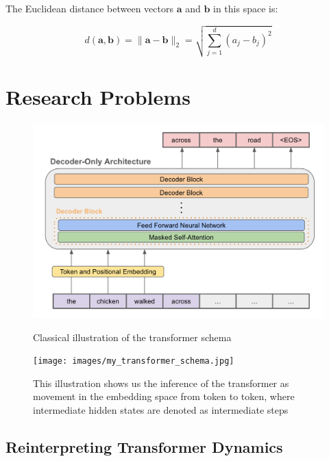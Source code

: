 The Euclidean distance between vectors $\mathbf{a}$ and $\mathbf{b}$ in this space is:

\begin{equation}
    d(\mathbf{a}, \mathbf{b}) = \|\mathbf{a} - \mathbf{b}\|_2 = \sqrt{\sum_{j=1}^d (a_j - b_j)^2}
    \label{eq::euclidean}
\end{equation}

\section{Research Problems}

\begin{figure}[h]
    \centering
    \begin{minipage}{0.37\textwidth}
        \centering
        \includegraphics[width=\textwidth]{images/classic_transformer_schema.png}
        \caption{Classical illustration of the transformer schema}
        \label{fig:classic_transformer}
    \end{minipage}
    \hfill
    \begin{minipage}{0.57\textwidth}
        \centering
        \texttt{[image: images/my\_transformer\_schema.jpg]}
        \caption{This illustration shows us the inference of the transformer as movement in the embedding space from token to token, where intermediate hidden states are denoted as intermediate steps}
        \label{fig:my_transformer}
    \end{minipage}
\end{figure}

\subsection{Reinterpreting Transformer Dynamics}


